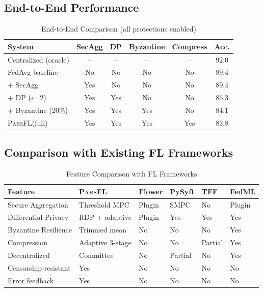 \documentclass[11pt,a4paper]{article}
\newcommand{\parsfl}{\textsc{ParsFL}\xspace}
\begin{document}
\subsection{End-to-End Performance}

\begin{table}[H]
\centering
\caption{End-to-End Comparison (all protections enabled)}
\label{tab:e2e}
\begin{tabular}{lccccc}
\toprule
\textbf{System} & \textbf{SecAgg} & \textbf{DP} & \textbf{Byzantine} & \textbf{Compress} & \textbf{Acc.} \\
\midrule
Centralized (oracle) & -- & -- & -- & -- & 92.0 \\
FedAvg baseline & No & No & No & No & 89.4 \\
+ SecAgg & Yes & No & No & No & 89.4 \\
+ DP ($\varepsilon$=2) & Yes & Yes & No & No & 86.3 \\
+ Byzantine (20\%) & Yes & Yes & Yes & No & 84.1 \\
\parsfl (full) & Yes & Yes & Yes & Yes & 83.8 \\
\bottomrule
\end{tabular}
\end{table}

\subsection{Comparison with Existing FL Frameworks}

\begin{table}[H]
\centering
\caption{Feature Comparison with FL Frameworks}
\label{tab:frameworks}
\begin{tabularx}{\textwidth}{lXXXXX}
\toprule
\textbf{Feature} & \textbf{\parsfl} & \textbf{Flower} & \textbf{PySyft} & \textbf{TFF} & \textbf{FedML} \\
\midrule
Secure Aggregation & Threshold MPC & Plugin & SMPC & No & Plugin \\
Differential Privacy & RDP + adaptive & Plugin & Yes & Yes & Yes \\
Byzantine Resilience & Trimmed mean & No & No & No & Yes \\
Compression & Adaptive 3-stage & No & No & Partial & Yes \\
Decentralized & Committee & No & Partial & No & Yes \\
Censorship-resistant & Yes & No & No & No & No \\
Error feedback & Yes & No & No & No & No \\
\bottomrule
\end{tabularx}
\end{table}
\end{document}
